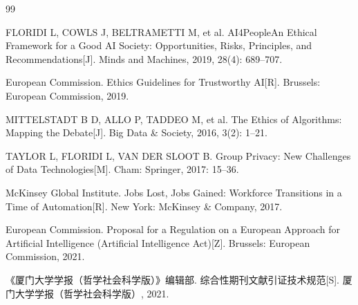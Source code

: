 \documentclass{xmu_course}
\begin{document}
\begin{thebibliography}{99}

FLORIDI L, COWLS J, BELTRAMETTI M, et al.
AI4People\xmuemdash An Ethical Framework for a Good AI Society:
Opportunities, Risks, Principles, and Recommendations[J].
Minds and Machines, 2019, 28(4): 689--707.

European Commission.
Ethics Guidelines for Trustworthy AI[R].
Brussels: European Commission, 2019.

MITTELSTADT B D, ALLO P, TADDEO M, et al.
The Ethics of Algorithms: Mapping the Debate[J].
Big Data \& Society, 2016, 3(2): 1--21.

TAYLOR L, FLORIDI L, VAN DER SLOOT B.
Group Privacy: New Challenges of Data Technologies[M].
Cham: Springer, 2017: 15--36.

McKinsey Global Institute.
Jobs Lost, Jobs Gained: Workforce Transitions in a Time of Automation[R].
New York: McKinsey \& Company, 2017.

European Commission.
Proposal for a Regulation on a European Approach for Artificial Intelligence
(Artificial Intelligence Act)[Z].
Brussels: European Commission, 2021.

《厦门大学学报（哲学社会科学版）》编辑部.
综合性期刊文献引证技术规范[S].
厦门大学学报（哲学社会科学版）, 2021.

\end{thebibliography}

\makeenabstract
\end{document}
